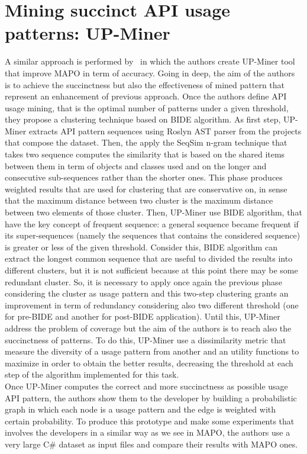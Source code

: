 \section{Mining succinct API usage patterns: UP-Miner}
A similar approach is performed by~\cite{wang_mining_2013} in which the authors create UP-Miner tool that improve MAPO in term of accuracy. Going in deep, the aim of the authors is to achieve the succinctness but also the effectiveness of mined pattern that represent an enhancement of previous approach. Once the authors define API usage mining, that is the optimal number of patterns under a given threshold, they propose a clustering technique based on BIDE algorithm. As first step, UP-Miner extracts API pattern sequences using Roslyn AST parser from the projects that compose the dataset. Then, the apply the SeqSim n-gram technique that takes two sequence computes the similarity that is based on the shared items between them in term of objects and classes used and on the longer and consecutive sub-sequences rather than the shorter ones. This phase produces weighted results that are used for clustering that are conservative on, in sense that the maximum distance between two cluster is the maximum distance between two elements of those cluster.\newline
Then, UP-Miner use BIDE algorithm, that have the key concept of frequent sequence: a general sequence became frequent if its super-sequences (namely the sequences that contains the considered sequence) is greater or less of the given threshold. Consider this, BIDE algorithm can extract the longest common sequence that are useful to divided the results into different clusters, but it is not sufficient because at this point there may be some redundant cluster. So, it is necessary to apply once again the previous phase considering the cluster as usage pattern and this two-step clustering grants an improvement in term of redundancy considering also two different threshold (one for pre-BIDE and another for post-BIDE application). Until this, UP-Miner address the problem of coverage but the aim of the authors is to reach also the succinctness of patterns. To do this, UP-Miner use a dissimilarity metric that measure the diversity of a usage pattern from another and an utility functions to maximize in order to obtain the better results, decreasing the threshold at each step of the algorithm implemented for this task. \\
Once UP-Miner computes the correct and more succinctness as possible usage API pattern, the authors show them to the developer by building a probabilistic graph in which each node is a usage pattern and the edge is weighted with certain probability. To produce this prototype and make some experiments that involves the developers in a similar way as we see in MAPO, the authors use a very large C\# dataset as input files and compare their results with MAPO ones.

